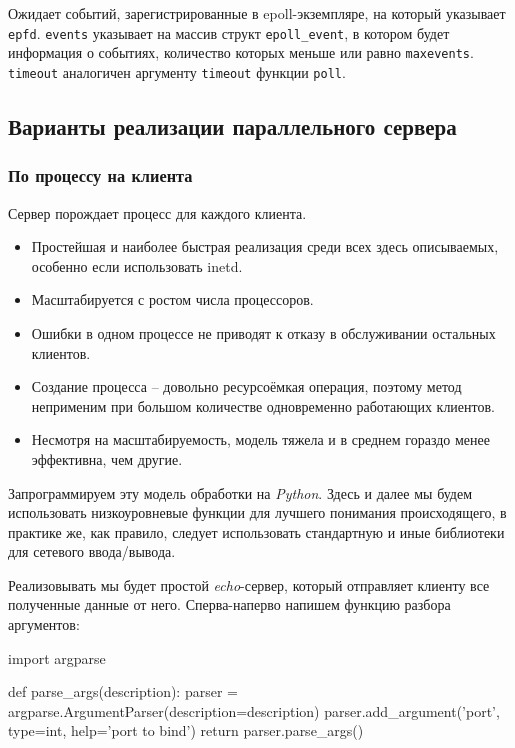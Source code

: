Ожидает событий, зарегистрированные в epoll-экземпляре, на который указывает \lstinline{epfd}. \lstinline{events} указывает на массив структ \lstinline{epoll_event}, в котором будет информация о событиях, количество которых меньше или равно \lstinline{maxevents}. \lstinline{timeout} аналогичен аргументу \lstinline{timeout} функции \lstinline{poll}.

\subsection{Варианты реализации параллельного сервера}

\subsubsection{По процессу на клиента}
Сервер порождает процесс для каждого клиента.
\begin{itemize}
  \item[\Checkmark] Простейшая и наиболее быстрая реализация среди всех здесь описываемых, особенно если использовать inetd.
  \item[\Checkmark] Масштабируется с ростом числа процессоров.
  \item[\Checkmark] Ошибки в одном процессе не приводят к отказу в обслуживании остальных клиентов.
  \item[\XSolidBrush] Создание процесса -- довольно ресурсоёмкая операция, поэтому метод неприменим при большом количестве одновременно работающих клиентов.
  \item[\XSolidBrush] Несмотря на масштабируемость, модель тяжела и в среднем гораздо менее эффективна, чем другие.
\end{itemize}

Запрограммируем эту модель обработки на \emph{Python}. Здесь и далее мы будем использовать низкоуровневые функции для лучшего понимания происходящего, в практике же, как правило, следует использовать стандартную и иные библиотеки для сетевого ввода/вывода.

Реализовывать мы будет простой \emph{echo}-сервер, который отправляет клиенту все полученные данные от него. Сперва-наперво напишем функцию разбора аргументов:
\begin{pylst}{}{}
import argparse

def parse_args(description):
    parser = argparse.ArgumentParser(description=description)
    parser.add_argument('port', type=int, help='port to bind')
    return parser.parse_args()
\end{pylst}

